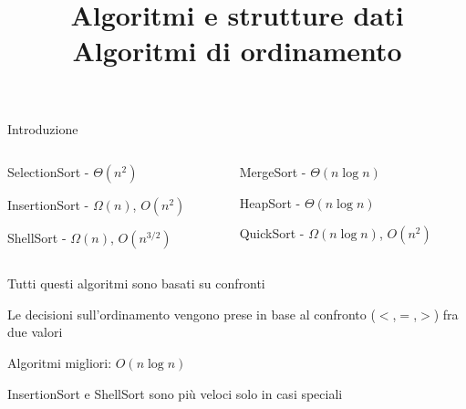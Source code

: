 

\graphicspath{{figs/A1/}}



\title[ASD - Algoritmi di ordinamento]{\textbf{Algoritmi e strutture dati}\\[24pt]Algoritmi di ordinamento}

\FrameTitle{}


\begin{frame}{Introduzione}

\vspace{-9pt}
\begin{myboxtitle}
\begin{columns}
\begin{column}{0.48\textwidth}
\BI
\item SelectionSort - $\Theta(n^2)$
\item InsertionSort - $\Omega(n)$, $O(n^2)$
\item ShellSort - $\Omega(n)$, $O(n^{3/2})$
\EI
\end{column}
\begin{column}{0.48\textwidth} 
\BI
\item MergeSort - $\Theta(n \log n)$
\item HeapSort - $\Theta(n \log n)$
\item QuickSort - $\Omega(n \log n)$, $O(n^2)$
\EI
\end{column}
\end{columns}
\end{myboxtitle}


\begin{myboxtitle}
\BI
\item \alert{Tutti questi algoritmi sono basati su confronti}
\BI
\item Le decisioni sull'ordinamento vengono prese in base al confronto ($<$,$=$,$>$) fra due valori
\EI
\item \alert{Algoritmi migliori: $O(n \log n)$}
\BI
\item InsertionSort e ShellSort sono più veloci solo in casi speciali
\EI
\EI
\end{myboxtitle}

\end{frame}


